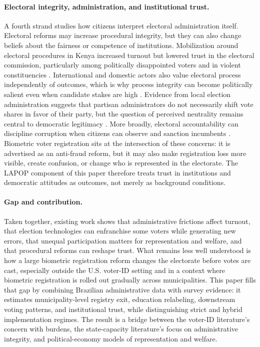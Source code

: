 \paragraph{Electoral integrity, administration, and institutional trust.}
A fourth strand studies how citizens interpret electoral administration itself. Electoral reforms may increase procedural integrity, but they can also change beliefs about the fairness or competence of institutions. Mobilization around electoral procedures in Kenya increased turnout but lowered trust in the electoral commission, particularly among politically disappointed voters and in violent constituencies \cite{Marx2021VoterMobilisaAnd}. International and domestic actors also value electoral process independently of outcomes, which is why process integrity can become politically salient even when candidate stakes are high \cite{Bubeck2017ProcessCandidatThe}. Evidence from local election administration suggests that partisan administrators do not necessarily shift vote shares in favor of their party, but the question of perceived neutrality remains central to democratic legitimacy \cite{Ferrer2023HowPartisanLocal}. More broadly, electoral accountability can discipline corruption when citizens can observe and sanction incumbents \cite{ferrazFinan2011}. Biometric voter registration sits at the intersection of these concerns: it is advertised as an anti-fraud reform, but it may also make registration loss more visible, create confusion, or change who is represented in the electorate. The LAPOP component of this paper therefore treats trust in institutions and democratic attitudes as outcomes, not merely as background conditions.

\paragraph{Gap and contribution.}
Taken together, existing work shows that administrative frictions affect turnout, that election technologies can enfranchise some voters while generating new errors, that unequal participation matters for representation and welfare, and that procedural reforms can reshape trust. What remains less well understood is how a large biometric registration reform changes the electorate before votes are cast, especially outside the U.S. voter-ID setting and in a context where biometric registration is rolled out gradually across municipalities. This paper fills that gap by combining Brazilian administrative data with survey evidence: it estimates municipality-level registry exit, education relabeling, downstream voting patterns, and institutional trust, while distinguishing strict and hybrid implementation regimes. The result is a bridge between the voter-ID literature's concern with burdens, the state-capacity literature's focus on administrative integrity, and political-economy models of representation and welfare.
